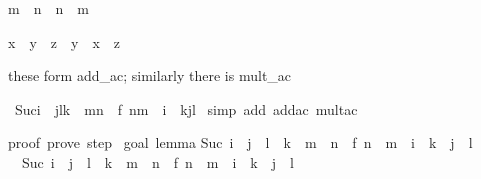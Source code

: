 \begin{isabellebody}
\begin{isamarkuptext}
\begin{isabelle}%
m\ {\isacharplus}\ n\ {\isacharequal}\ n\ {\isacharplus}\ m%
\end{isabelle}

\begin{isabelle}%
x\ {\isacharplus}\ {\isacharparenleft}y\ {\isacharplus}\ z{\isacharparenright}\ {\isacharequal}\ y\ {\isacharplus}\ {\isacharparenleft}x\ {\isacharplus}\ z{\isacharparenright}%
\end{isabelle}

these form add_ac; similarly there is mult_ac%
\end{isamarkuptext}%
\ {\isachardoublequote}Suc{\isacharparenleft}i\ {\isacharplus}\ j{\isacharasterisk}l{\isacharasterisk}k\ {\isacharplus}\ m{\isacharasterisk}n{\isacharparenright}\ {\isacharequal}\ f\ {\isacharparenleft}n{\isacharasterisk}m\ {\isacharplus}\ i\ {\isacharplus}\ k{\isacharasterisk}j{\isacharasterisk}l{\isacharparenright}{\isachardoublequote}\isanewline
{}\ {\isacharparenleft}simp\ add{\isacharcolon}\ add{\isacharunderscore}ac\ mult{\isacharunderscore}ac{\isacharparenright}\isanewline
{}%
\begin{isamarkuptext}%
proof\ {\isacharparenleft}prove{\isacharparenright}{\isacharcolon}\ step\ {}\isanewline
\isanewline
goal\ {\isacharparenleft}lemma{\isacharparenright}{\isacharcolon}\isanewline
Suc\ {\isacharparenleft}i\ {\isacharplus}\ j\ {\isacharasterisk}\ l\ {\isacharasterisk}\ k\ {\isacharplus}\ m\ {\isacharasterisk}\ n{\isacharparenright}\ {\isacharequal}\ f\ {\isacharparenleft}n\ {\isacharasterisk}\ m\ {\isacharplus}\ i\ {\isacharplus}\ k\ {\isacharasterisk}\ j\ {\isacharasterisk}\ l{\isacharparenright}\isanewline
\ {}{\isachardot}\ Suc\ {\isacharparenleft}i\ {\isacharplus}\ j\ {\isacharasterisk}\ l\ {\isacharasterisk}\ k\ {\isacharplus}\ m\ {\isacharasterisk}\ n{\isacharparenright}\ {\isacharequal}\ f\ {\isacharparenleft}n\ {\isacharasterisk}\ m\ {\isacharplus}\ i\ {\isacharplus}\ k\ {\isacharasterisk}\ j\ {\isacharasterisk}\ l{\isacharparenright}


\end{isamarkuptext}
\end{isabellebody}
